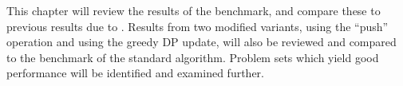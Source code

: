This chapter will review the results of the benchmark, and compare these to previous results due to \textcite{deGivry14}.
Results from two modified variants, using the \enquote{push} operation and using the greedy DP update, will also be reviewed and compared to the benchmark of the standard algorithm.
Problem sets which yield good performance will be identified and examined further.

